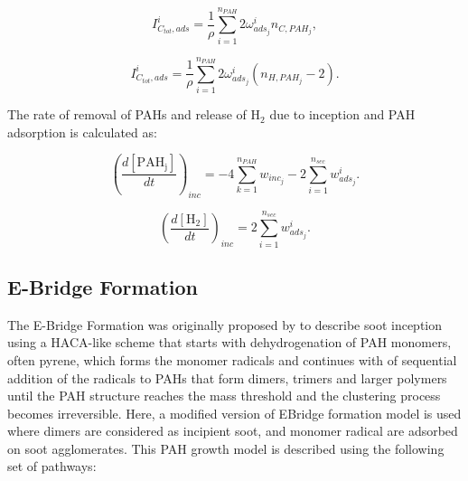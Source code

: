\begin{equation}
	I^i_{C_{tot},ads} =
	\frac{1}{\rho}
	\sum_{i=1}^{n_{PAH}}
	2\omega^i_{ads_j}
	n_{C,PAH_j}
	\label{eqn:ICtotads_dimcoal},
\end{equation}

\begin{equation}
	I^i_{C_{tot},ads} =
	\frac{1}{\rho}
	\sum_{i=1}^{n_{PAH}}
	2\omega^i_{ads_j}
	\left(n_{H,PAH_j}-2\right)
	\label{eqn:IHtotads_dimcoal}.
\end{equation}

The rate of removal of PAHs and release of $\mathrm{H_2}$ due to inception and PAH adsorption is calculated as:

\begin{equation}
	\left(
		\frac{d\left[{\mathrm{PAH_j}}\right]}{dt}
	\right)_{inc}
	= 
	-4\sum_{k=1}^{n_{PAH}}w_{inc_{j}}-2\sum_{i=1}^{n_{sec}}w^i_{ads_j}
	\label{eqn:PAHscrub_dimcoal}.
\end{equation}

\begin{equation}
	\left(
		\frac{d\left[{\mathrm{H_2}}\right]}{dt}
	\right)_{inc}
	= 
	2\sum_{i=1}^{n_{sec}}w^i_{ads_j}
	\label{eqn:H2scrub_dimcoal}.
\end{equation}

\subsection{E-Bridge Formation}
The E-Bridge Formation was originally proposed by \citet{frenklach2020mechanism} to describe soot inception using a HACA-like scheme that starts with dehydrogenation of PAH monomers, often pyrene, which forms the monomer radicals and continues with of sequential addition of the radicals to PAHs that form dimers, trimers and larger polymers until the PAH structure reaches the mass threshold and the clustering process becomes irreversible. Here, a modified version of EBridge formation model is used where dimers are considered as incipient soot, and monomer radical are adsorbed on soot agglomerates. This PAH growth model is described using the following set of pathways:




